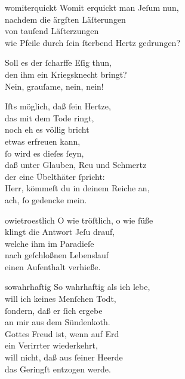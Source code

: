 \documentclass[abbrwidth=6em,tocstyle=ref-genre,shorttitlesize=50]{ees}
\begin{document}
{\begin{movement}{womiterquickt}
  \voice[Soprano]
  Womit erquickt man Jeſum nun,\\
  nachdem die ärgſten Läſterungen\\
  von tauſend Läſterzungen\\
  wie Pfeile durch ſein ſterbend Hertz gedrungen?

  \voice[Tenore]
  Soll es der ſcharffe Eſig thun,\\
  den ihm ein Kriegsknecht bringt?\\
  Nein, grauſame, nein, nein!

  \voice[Soprano]
  Iſts möglich, daß ſein Hertze,\\
  das mit dem Tode ringt,\\
  noch eh es völlig bricht\\
  etwas erfreuen kann,\\
  ſo wird es dieſes ſeyn,\\
  daß unter Glauben, Reu und Schmertz\\
  der eine Übelthäter ſpricht:\\
  Herr, kömmeſt du in deinem Reiche an,\\
  ach, ſo gedencke mein.
\end{movement}

\begin{movement}{owietroestlich}
  O wie tröſtlich, o wie ſüße\\
  klingt die Antwort Jeſu drauf,\\
  welche ihm im Paradieſe\\
  nach geſchloßnen Lebenslauf\\
  einen Aufenthalt verhieße.
\end{movement}

\clearpage
\begin{movement}{sowahrhaftig}
  \voice[Coro]
  So wahrhaftig als ich lebe,\\
  will ich keines Menſchen Todt,\\
  ſondern, daß er ſich ergebe\\
  an mir aus dem Sündenkoth.\\
  Gottes Freud ist, wenn auf Erd\\
  ein Verirrter wiederkehrt,\\
  will nicht, daß aus ſeiner Heerde\\
  das Geringſt entzogen werde.
\end{movement}

}
\end{document}
